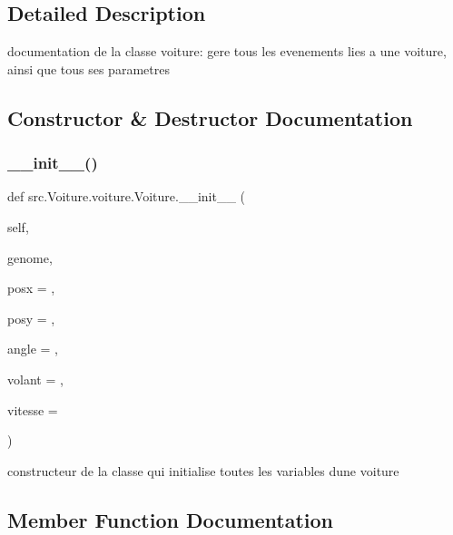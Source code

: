 \subsection{Detailed Description}
documentation de la classe voiture\+: gere tous les evenements lies a une voiture, ainsi que tous ses parametres 

\subsection{Constructor \& Destructor Documentation}
\mbox{\label{classsrc_1_1_voiture_1_1voiture_1_1_voiture_a5f36479e14f3127db26dfc408a626edf}} 
\subsubsection{\texorpdfstring{\+\_\+\+\_\+init\+\_\+\+\_\+()}{\_\_init\_\_()}}
{\footnotesize\ttfamily def src.\+Voiture.\+voiture.\+Voiture.\+\_\+\+\_\+init\+\_\+\+\_\+ (\begin{DoxyParamCaption}\item[{}]{self,  }\item[{}]{genome,  }\item[{}]{posx = {},  }\item[{}]{posy = {},  }\item[{}]{angle = {},  }\item[{}]{volant = {},  }\item[{}]{vitesse = {} }\end{DoxyParamCaption})}



constructeur de la classe qui initialise toutes les variables d\textquotesingle{}une voiture 



\subsection{Member Function Documentation}
\mbox{\label{classsrc_1_1_voiture_1_1voiture_1_1_voiture_a0800c81e2f1de13938bf6b61787dc781}} 

